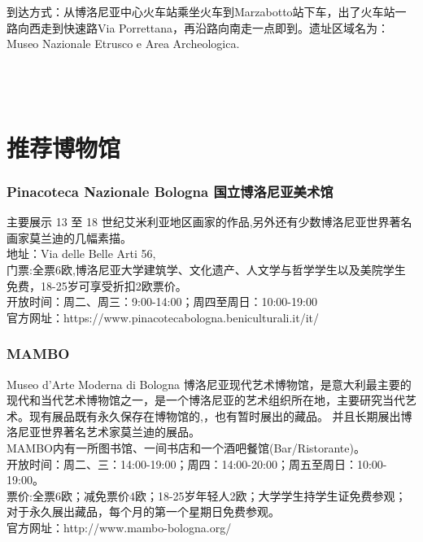 到达方式：从博洛尼亚中心火车站乘坐火车到Marzabotto站下车，出了火车站一路向西走到快速路Via Porrettana，再沿路向南走一点即到。遗址区域名为：Museo Nazionale Etrusco e Area Archeologica.
\\
\\
\\
\\

\section{推荐博物馆}

\subsubsection{Pinacoteca Nazionale Bologna 国立博洛尼亚美术馆}
主要展示 13 至 18 世纪艾米利亚地区画家的作品,另外还有少数博洛尼亚世界著名画家莫兰迪的几幅素描。\\
地址：Via delle Belle Arti 56, \\
门票:全票6欧,博洛尼亚大学建筑学、文化遗产、人文学与哲学学生以及美院学生免费，18-25岁可享受折扣2欧票价。\\
开放时间：周二、周三：9:00-14:00；周四至周日：10:00-19:00\\
官方网址：https://www.pinacotecabologna.beniculturali.it/it/

\subsubsection{MAMBO}
Museo d'Arte Moderna di Bologna 博洛尼亚现代艺术博物馆，是意大利最主要的现代和当代艺术博物馆之一，是一个博洛尼亚的艺术组织所在地，主要研究当代艺术。现有展品既有永久保存在博物馆的,，也有暂时展出的藏品。 并且长期展出博洛尼亚世界著名艺术家莫兰迪的展品。\\ 
MAMBO内有一所图书馆、一间书店和一个酒吧餐馆(Bar/Ristorante)。\\
开放时间：周二、三：14:00-19:00；周四：14:00-20:00；周五至周日：10:00-19:00。\\
票价:全票6欧；减免票价4欧；18-25岁年轻人2欧；大学学生持学生证免费参观；对于永久展出藏品，每个月的第一个星期日免费参观。\\
官方网址：http://www.mambo-bologna.org/

